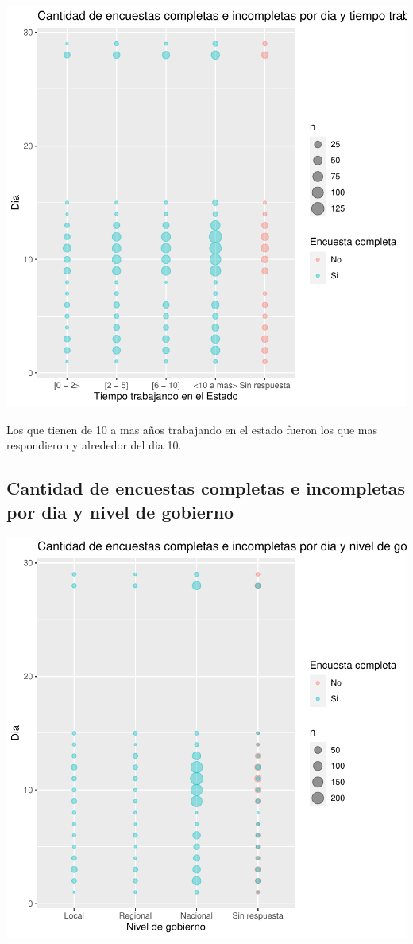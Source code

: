 \documentclass{article}
\begin{document}
\includegraphics{seguimientov3-049}

Los que tienen de 10 a mas años trabajando en el estado fueron los que mas respondieron y alrededor del dia 10.

\subsection{Cantidad de encuestas completas e incompletas por dia y nivel de gobierno}

\includegraphics{seguimientov3-050}
\end{document}

